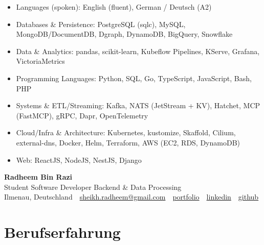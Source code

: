 \documentclass[10pt,a4paper]{resume}
\makeatletter
\newcommand{\Portfolio}{https://radheem.github.io/my-cv}
\newcommand{\PortfolioText}{portfolio}
\newcommand{\GitHub}{https://github.com/radheem}
\newcommand{\LinkedIn}{https://www.linkedin.com/in/radheem-razi}
\newcommand{\Email}{sheikh.radheem@gmail.com}
\makeatother
\begin{document}
\begin{itemize}[leftmargin=1.4em,nosep,topsep=2pt]
  \item Languages (spoken): English (fluent), German / Deutsch (A2)
  \item Databases \& Persistence: PostgreSQL (sqlc), MySQL, MongoDB/DocumentDB, Dgraph, DynamoDB, BigQuery, Snowflake
  \item Data \& Analytics: pandas, scikit-learn, Kubeflow Pipelines, KServe, Grafana, VictoriaMetrics
  \item Programming Languages: Python, SQL, Go, TypeScript, JavaScript, Bash, PHP
  \item Systems \& ETL/Streaming: Kafka, NATS (JetStream + KV), Hatchet, MCP (FastMCP), gRPC, Dapr, OpenTelemetry
  \item Cloud/Infra \& Architecture: Kubernetes, kustomize, Skaffold, Cilium, external-dns, Docker, Helm, Terraform, AWS (EC2, RDS, DynamoDB)
  \item Web: ReactJS, NodeJS, NestJS, Django
\end{itemize}

\clearpage
{}

\begin{center}
  {\huge\bfseries Radheem Bin Razi}\\[3pt]
  {\large Student Software Developer Backend \& Data Processing}\\[6pt]
  \small
  Ilmenau, Deutschland \,\textbar\,
  \href{mailto:\Email}{\Email} \,\textbar\,
  \href{\Portfolio}{\PortfolioText} \,\textbar\,
  \href{\LinkedIn}{linkedin} \,\textbar\,
  \href{\GitHub}{github}
\end{center}
\vspace{2pt}

\section{Berufserfahrung}
\end{document}
